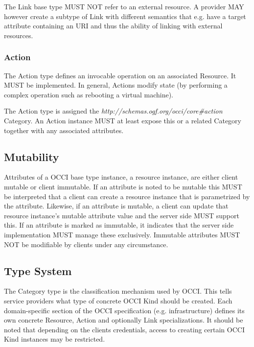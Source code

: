 \documentclass[10pt,a4paper]{article}
\begin{document}
The Link base type MUST NOT refer to an external resource. A provider MAY however create a subtype of Link with different semantics that e.g. have a target attribute containing an URI and thus the ability of linking with external resources.

\subsubsection{Action}
The Action type defines an invocable operation on an associated Resource. It MUST be implemented. In general, Actions modify state (by performing a complex operation such as rebooting a virtual machine).

The Action type is assigned the \textit{http://schemas.ogf.org/occi/core\#action} Category. An Action instance MUST at least expose this or a related Category together with any associated attributes.

\subsection{Mutability}
Attributes of a OCCI base type instance, a resource instance, are either client mutable or client immutable. If an attribute is noted to be mutable this MUST be interpreted that a client can create a resource instance that is parametrized by the attribute. Likewise, if an attribute is mutable, a client can update that resource instance's mutable attribute value and the server side MUST support this. If an attribute is marked as immutable, it indicates that the server side implementation MUST manage these exclusively. Immutable attributes MUST NOT be modifiable by clients under any circumstance.

\subsection{Type System}
\label{sec:type_system}
The Category type is the classification mechanism used by OCCI. This tells service providers what type of concrete OCCI Kind should be created. Each domain-specific section of the OCCI specification (e.g. infrastructure) defines its own concrete Resource, Action and optionally Link specializations. It should be noted that depending on the clients credentials, access to creating certain OCCI Kind instances may be restricted.
\end{document}
